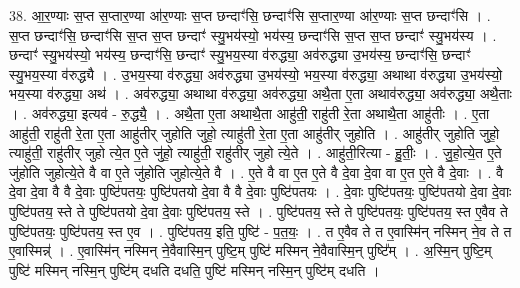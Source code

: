 \documentclass[17pt]{extarticle}
\begin{document}
38. आ॒र॒ण्याः स॒प्त स॒प्तार॒ण्या आ॑र॒ण्याः स॒प्त छन्दाꣳ॑सि॒ छन्दाꣳ॑सि स॒प्तार॒ण्या आ॑र॒ण्याः स॒प्त छन्दाꣳ॑सि । . स॒प्त छन्दाꣳ॑सि॒ छन्दाꣳ॑सि स॒प्त स॒प्त छन्दाꣳ॑ स्यु॒भय॑स्यो॒ भय॑स्य॒ छन्दाꣳ॑सि स॒प्त स॒प्त छन्दाꣳ॑ स्यु॒भय॑स्य । . छन्दाꣳ॑ स्यु॒भय॑स्यो॒ भय॑स्य॒ छन्दाꣳ॑सि॒ छन्दाꣳ॑ स्यु॒भय॒स्या व॑रुद्ध्या॒ अव॑रुद्ध्या उ॒भय॑स्य॒ छन्दाꣳ॑सि॒ छन्दाꣳ॑ स्यु॒भय॒स्या व॑रुद्ध्यै । . उ॒भय॒स्या व॑रुद्ध्या॒ अव॑रुद्ध्या उ॒भय॑स्यो॒ भय॒स्या व॑रुद्ध्या॒ अथाथा व॑रुद्ध्या उ॒भय॑स्यो॒ भय॒स्या व॑रुद्ध्या॒ अथ॑ । . अव॑रुद्ध्या॒ अथाथा व॑रुद्ध्या॒ अव॑रुद्ध्या॒ अथै॒ता ए॒ता अथाव॑रुद्ध्या॒ अव॑रुद्ध्या॒ अथै॒ताः । . अव॑रुद्ध्या॒ इत्यव॑ - रु॒द्ध्यै॒ । . अथै॒ता ए॒ता अथाथै॒ता आहु॑ती॒ राहु॑ती रे॒ता अथाथै॒ता आहु॑तीः । . ए॒ता आहु॑ती॒ राहु॑ती रे॒ता ए॒ता आहु॑तीर् जुहोति जुहो॒ त्याहु॑ती रे॒ता ए॒ता आहु॑तीर् जुहोति । . आहु॑तीर् जुहोति जुहो॒ त्याहु॑ती॒ राहु॑तीर् जुहो त्ये॒त ए॒ते जु॑हो॒ त्याहु॑ती॒ राहु॑तीर् जुहो त्ये॒ते । . आहु॑ती॒रित्या - हु॒तीः॒ । . जु॒हो॒त्ये॒त ए॒ते जु॑होति जुहोत्ये॒ते वै वा ए॒ते जु॑होति जुहोत्ये॒ते वै । . ए॒ते वै वा ए॒त ए॒ते वै दे॒वा दे॒वा वा ए॒त ए॒ते वै दे॒वाः । . वै दे॒वा दे॒वा वै वै दे॒वाः पुष्टि॑पतयः॒ पुष्टि॑पतयो दे॒वा वै वै दे॒वाः पुष्टि॑पतयः । . दे॒वाः पुष्टि॑पतयः॒ पुष्टि॑पतयो दे॒वा दे॒वाः पुष्टि॑पतय॒ स्ते ते पुष्टि॑पतयो दे॒वा दे॒वाः पुष्टि॑पतय॒ स्ते । . पुष्टि॑पतय॒ स्ते ते पुष्टि॑पतयः॒ पुष्टि॑पतय॒ स्त ए॒वैव ते पुष्टि॑पतयः॒ पुष्टि॑पतय॒ स्त ए॒व । . पुष्टि॑पतय॒ इति॒ पुष्टि॑ - प॒त॒यः॒ । . त ए॒वैव ते त ए॒वास्मि॑न् नस्मिन् ने॒व ते त ए॒वास्मिन्न्॑ । . ए॒वास्मि॑न् नस्मिन् ने॒वैवास्मि॒न् पुष्टि॒म् पुष्टि॑ मस्मिन् ने॒वैवास्मि॒न् पुष्टि᳚म् । . अ॒स्मि॒न् पुष्टि॒म् पुष्टि॑ मस्मिन् नस्मि॒न् पुष्टि॑म् दधति दधति॒ पुष्टि॑ मस्मिन् नस्मि॒न् पुष्टि॑म् दधति । \newline
\end{document}
